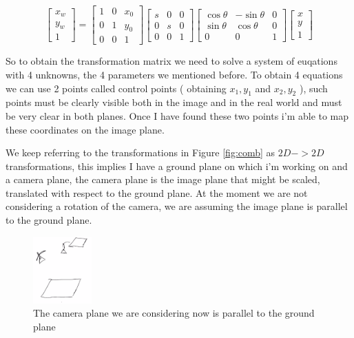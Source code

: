 \[
    \begin{bmatrix}
    x_w \\
    y_w \\
    1
    \end{bmatrix}
    =
    \begin{bmatrix}
    1 & 0 & x_0 \\
    0 & 1 & y_0 \\
    0 & 0 & 1
    \end{bmatrix}
    \begin{bmatrix}
        s & 0 & 0 \\
        0 & s & 0 \\
        0 & 0 & 1
    \end{bmatrix}
    \begin{bmatrix}
    \cos\theta & -\sin\theta & 0 \\
    \sin\theta & \cos\theta & 0 \\
    0 & 0 & 1
    \end{bmatrix}
    \begin{bmatrix}
        x \\
        y \\
        1
    \end{bmatrix}
\]

So to obtain the transformation matrix we need to solve a system of euqations with 4 unknowns, the 4 parameters we mentioned before. To obtain 4 equations we can use 2 points called control points ( obtaining \(x_1, y_1\) and \(x_2, y_2\) ), such points must be clearly visible both in the image and in the real world and must be very clear in both planes. Once I have found these two points i'm able to map these coordinates on the image plane.

We keep referring to the transformations in Figure \ref{fig:comb} as \(2D -> 2D \) transformations, this implies I have a ground plane on which i'm working on and a camera plane, the camera plane is the image plane that might be scaled, translated with respect to the ground plane. At the moment we are not considering a rotation of the camera, we are assuming the image plane is parallel to the ground plane.

\begin{figure}[H]
    \centering
    \includegraphics[width=0.2\textwidth]{Figures/planes.png}
    \caption{The camera plane we are considering now is parallel to the ground plane}
    \label{fig:planes}
\end{figure}



